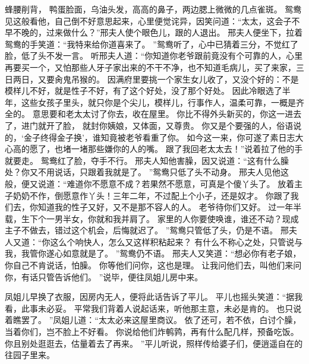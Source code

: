 蜂腰削背，
鸭蛋脸面，乌油头发，高高的鼻子，两边腮上微微的几点雀斑。
鸳鸯见这般看他，自己倒不好意思起来，心里便觉诧异，因笑问道：“太太，这会子不早不晚的，过来做什么？”邢夫人使个眼色儿，跟的人退出。
邢夫人便坐下，拉着鸳鸯的手笑道：“我特来给你道喜来了。
”鸳鸯听了，心中已猜着三分，不觉红了脸，低了头不发一言。
听邢夫人道：“你知道你老爷跟前竟没有个可靠的人，心里再要买一个，又怕那些人牙子家出来的不干不净，也不知道毛病儿，买了来家，三日两日，又要肏鬼吊猴的。
因满府里要挑一个家生女儿收了，又没个好的：不是模样儿不好，就是性子不好，有了这个好处，没了那个好处。
因此冷眼选了半年，这些女孩子里头，就只你是个尖儿，模样儿，行事作人，温柔可靠，一概是齐全的。
意思要和老太太讨了你去，收在屋里。
你比不得外头新买的，你这一进去了，进门就开了脸，
就封你姨娘，又体面，又尊贵。
你又是个要强的人，俗语说的，‘金子终得金子换’，谁知竟被老爷看重了你。
如今这一来，你可遂了素日志大心高的愿了，也堵一堵那些嫌你的人的嘴。
跟了我回老太太去！”说着拉了他的手就要走。
鸳鸯红了脸，夺手不行。
邢夫人知他害臊，因又说道：“这有什么臊处？你又不用说话，只跟着我就是了。
”鸳鸯只低了头不动身。
邢夫人见他这般，便又说道：“难道你不愿意不成？若果然不愿意，可真是个傻丫头了。
放着主子奶奶不作，倒愿意作丫头！三年二年，不过配上个小子，还是奴才。
你跟了我们去，你知道我的性子又好，又不是那不容人的人。
老爷待你们又好。
过一年半载，生下个一男半女，你就和我并肩了。
家里的人你要使唤谁，谁还不动？现成主子不做去，错过这个机会，后悔就迟了。
”鸳鸯只管低了头，仍是不语。
邢夫人又道：“你这么个响快人，怎么又这样积粘起来？
有什么不称心之处，只管说与我，我管你遂心如意就是了。
”鸳鸯仍不语。
邢夫人又笑道：“想必你有老子娘，你自己不肯说话，怕臊。
你等他们问你，这也是理。
让我问他们去，叫他们来问你，有话只管告诉他们。
”说毕，便往凤姐儿房中来。
\par
凤姐儿早换了衣服，因房内无人，便将此话告诉了平儿。
平儿也摇头笑道：“据我看，此事未必妥。
平常我们背着人说起话来，听他那主意，未必是肯的。
也只说着瞧罢了。
”凤姐儿道：“太太必来这屋里商议。
依了还可，若不依，白讨个臊，当着你们，岂不脸上不好看。
你说给他们炸鹌鹑，再有什么配几样，预备吃饭。
你且别处逛逛去，估量着去了再来。
”平儿听说，照样传给婆子们，便逍遥自在的往园子里来。
